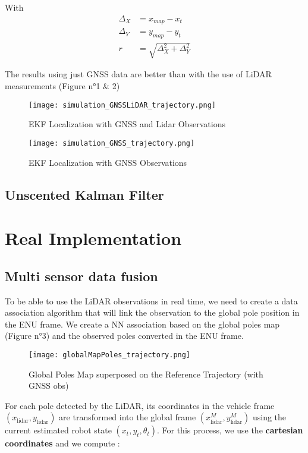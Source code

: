 \documentclass[conference]{IEEEtran}
\begin{document}
With 
\begin{align*}
    \Delta_X &= x_{map} - x_t \\ 
    \Delta_Y &= y_{map} - y_t \\ 
    r &= \sqrt{\Delta_X^2 + \Delta_Y^2}
\end{align*}

The results using just GNSS data are better than with the use of LiDAR measurements (Figure n°1 \& 2)

\begin{figure}[H]
    \centering
    \texttt{[image: simulation\_GNSSLiDAR\_trajectory.png]}
    \caption{EKF Localization with GNSS and Lidar Observations}
    \label{fig:enter-label}
\end{figure}

\begin{figure}[H]
    \centering
    \texttt{[image: simulation\_GNSS\_trajectory.png]}
    \caption{EKF Localization with GNSS Observations}
    \label{fig:enter-label}
\end{figure}
\subsection{Unscented Kalman Filter}

\newpage

\section{Real Implementation}

\subsection{Multi sensor data fusion}

To be able to use the LiDAR observations in real time, we need to create a data association algorithm that will link the observation to the global pole position in the ENU frame. We create a NN association based on the global poles map (Figure n°3) and the observed poles converted in the ENU frame.   

\begin{figure}[H]
    \centering
    \texttt{[image: globalMapPoles\_trajectory.png]}
    \caption{Global Poles Map superposed on the Reference Trajectory (with GNSS obs)}
    \label{fig:enter-label}
\end{figure}

For each pole detected by the LiDAR, its coordinates in the vehicle frame \((x_{\text{lidar}}, y_{\text{lidar}})\) are transformed into the global frame \((x_{\text{lidar}}^{M}, y_{\text{lidar}}^{M})\) using the current estimated robot state \((x_t, y_t, \theta_t)\). For this process, we use the \textbf{cartesian coordinates} and we compute :
\end{document}
